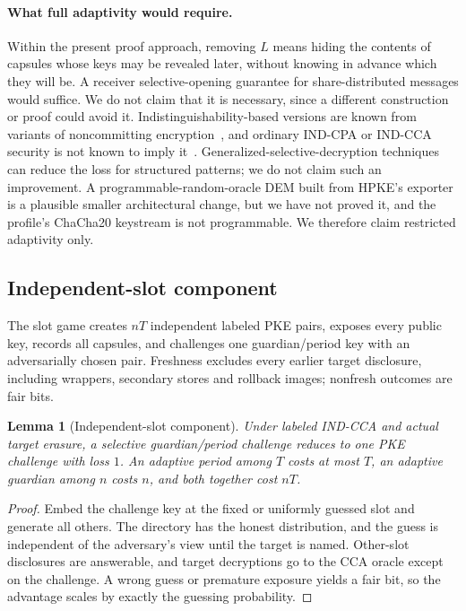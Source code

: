 \documentclass[pdflatex,sn-mathphys-num]{sn-jnl}
\theoremstyle{plain}
\newtheorem{lemma}[theorem]{Lemma}
\theoremstyle{definition}
\begin{document}
\paragraph{What full adaptivity would require.}
Within the present proof approach, removing $L$ means hiding the contents of capsules whose keys may be revealed later, without knowing in advance which they will be. A receiver selective-opening guarantee for share-distributed messages would suffice. We do not claim that it is necessary, since a different construction or proof could avoid it. Indistinguishability-based versions are known from variants of noncommitting encryption~\cite{hazay2015,canetti1996}, and ordinary IND-CPA or IND-CCA security is not known to imply it~\cite{bellare2009}. Generalized-selective-decryption techniques~\cite{panjwani2007,jafargholi2017} can reduce the loss for structured patterns; we do not claim such an improvement. A programmable-random-oracle DEM built from HPKE's exporter is a plausible smaller architectural change, but we have not proved it, and the profile's ChaCha20 keystream is not programmable. We therefore claim restricted adaptivity only.

\subsection{Independent-slot component}\label{sec:slots}
The slot game creates $nT$ independent labeled PKE pairs, exposes every public key, records all capsules, and challenges one guardian/period key with an adversarially chosen pair. Freshness excludes every earlier target disclosure, including wrappers, secondary stores and rollback images; nonfresh outcomes are fair bits.

\begin{lemma}[Independent-slot component]\label{lem:slot}
Under labeled IND-CCA and actual target erasure, a selective guardian/period challenge reduces to one PKE challenge with loss $1$. An adaptive period among $T$ costs at most $T$, an adaptive guardian among $n$ costs $n$, and both together cost $nT$.
\end{lemma}
\begin{proof}
Embed the challenge key at the fixed or uniformly guessed slot and generate all others. The directory has the honest distribution, and the guess is independent of the adversary's view until the target is named. Other-slot disclosures are answerable, and target decryptions go to the CCA oracle except on the challenge. A wrong guess or premature exposure yields a fair bit, so the advantage scales by exactly the guessing probability.
\end{proof}
\end{document}
